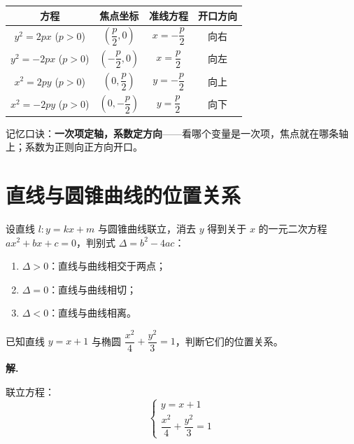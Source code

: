 \begin{theorem}[抛物线的标准方程]
\begin{center}
\begin{tabular}{c|c|c|c}
\toprule
方程 & 焦点坐标 & 准线方程 & 开口方向 \\
\midrule
$y^2 = 2px$ ($p > 0$) & $\left(\dfrac{p}{2}, 0\right)$ & $x = -\dfrac{p}{2}$ & 向右 \\
$y^2 = -2px$ ($p > 0$) & $\left(-\dfrac{p}{2}, 0\right)$ & $x = \dfrac{p}{2}$ & 向左 \\
$x^2 = 2py$ ($p > 0$) & $\left(0, \dfrac{p}{2}\right)$ & $y = -\dfrac{p}{2}$ & 向上 \\
$x^2 = -2py$ ($p > 0$) & $\left(0, -\dfrac{p}{2}\right)$ & $y = \dfrac{p}{2}$ & 向下 \\
\bottomrule
\end{tabular}
\end{center}
\end{theorem}

\begin{note}
记忆口诀：\textbf{一次项定轴，系数定方向}——看哪个变量是一次项，焦点就在哪条轴上；系数为正则向正方向开口。
\end{note}

\section{直线与圆锥曲线的位置关系}

\begin{theorem}[位置关系的判定]
设直线 $l: y = kx + m$ 与圆锥曲线联立，消去 $y$ 得到关于 $x$ 的一元二次方程 $ax^2 + bx + c = 0$，判别式 $\Delta = b^2 - 4ac$：
\begin{enumerate}
    \item $\Delta > 0$：直线与曲线相交于两点；
    \item $\Delta = 0$：直线与曲线相切；
    \item $\Delta < 0$：直线与曲线相离。
\end{enumerate}
\end{theorem}

\begin{example}
已知直线 $y = x + 1$ 与椭圆 $\dfrac{x^2}{4} + \dfrac{y^2}{3} = 1$，判断它们的位置关系。
\end{example}

\textbf{解.}

联立方程：
\[ \begin{cases} y = x + 1 \\ \dfrac{x^2}{4} + \dfrac{y^2}{3} = 1 \end{cases} \]

